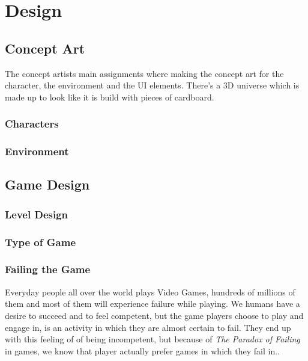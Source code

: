 \chapter{Design}
\label{ch:kap4}

\section{Concept Art}
\label{ConceptArt}
The concept artists main assignments where making the concept art for the character, the environment and the UI elements. There's a 3D universe which is made up to look like it is build with pieces of cardboard.

\subsection{Characters}
\label{Characters}
\cite{DynamicCharacters}

\subsection{Environment}
\label{Environment}

\section{Game Design}
\label{GameDesign}

\subsection{Level Design}
\label{LevelDesign}

\subsection{Type of Game}

\subsection{Failing the Game}
Everyday people all over the world plays Video Games, hundreds of millions of them and most of them will experience failure while playing. We humans have a desire to succeed and to feel competent, but the game players choose to play and engage in, is an activity in which they are almost certain to fail. They end up with this feeling of of being incompetent, but because of \textit{The Paradox of Failing} in games, we know that player actually prefer games in which they fail in.\cite[P.~2]{TheArtOfFailure}.

